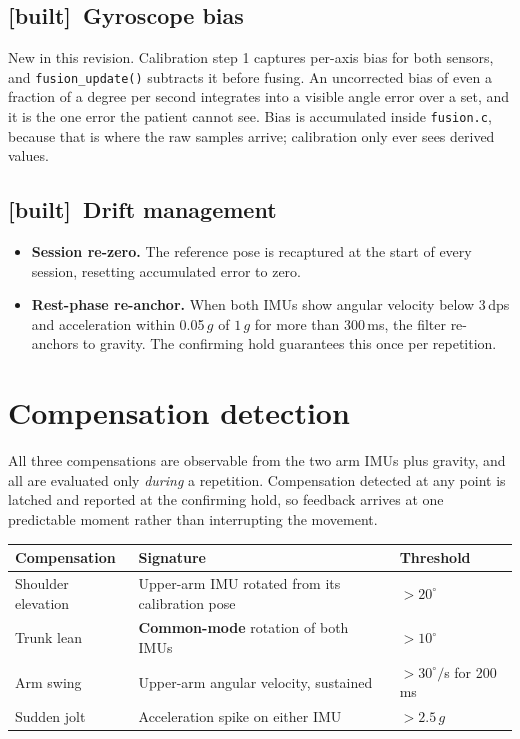 \documentclass[11pt]{article}
\newcommand{\built}{{\sffamily\scriptsize\color{good}\textbf{[built]}}\ }
\begin{document}
\subsection{\built Gyroscope bias}

New in this revision. Calibration step 1 captures per-axis bias for both
sensors, and \texttt{fusion\_update()} subtracts it before fusing. An
uncorrected bias of even a fraction of a degree per second integrates into a
visible angle error over a set, and it is the one error the patient cannot
see. Bias is accumulated inside \texttt{fusion.c}, because that is where the
raw samples arrive; calibration only ever sees derived values.

\subsection{\built Drift management}

\begin{itemize}
\item \textbf{Session re-zero.} The reference pose is recaptured at the start
of every session, resetting accumulated error to zero.
\item \textbf{Rest-phase re-anchor.} When both IMUs show angular velocity
below 3\,dps and acceleration within 0.05\,$g$ of $1\,g$ for more than
300\,ms, the filter re-anchors to gravity. The confirming hold guarantees this
once per repetition.
\end{itemize}

\section{Compensation detection}

All three compensations are observable from the two arm IMUs plus gravity, and
all are evaluated only \emph{during} a repetition. Compensation detected at
any point is latched and reported at the confirming hold, so feedback arrives
at one predictable moment rather than interrupting the movement.

\begin{table}[H]
\centering\small
\begin{tabularx}{\linewidth}{@{}p{24mm} X p{24mm}@{}}
\toprule
\textbf{Compensation} & \textbf{Signature} & \textbf{Threshold} \\
\midrule
Shoulder elevation & Upper-arm IMU rotated from its calibration pose & $>20^{\circ}$ \\[3pt]
Trunk lean & \textbf{Common-mode} rotation of both IMUs & $>10^{\circ}$ \\[3pt]
Arm swing & Upper-arm angular velocity, sustained & $>30^{\circ}/$s for 200\,ms \\[3pt]
Sudden jolt & Acceleration spike on either IMU & $>2.5\,g$ \\
\bottomrule
\end{tabularx}
\end{table}
\end{document}
